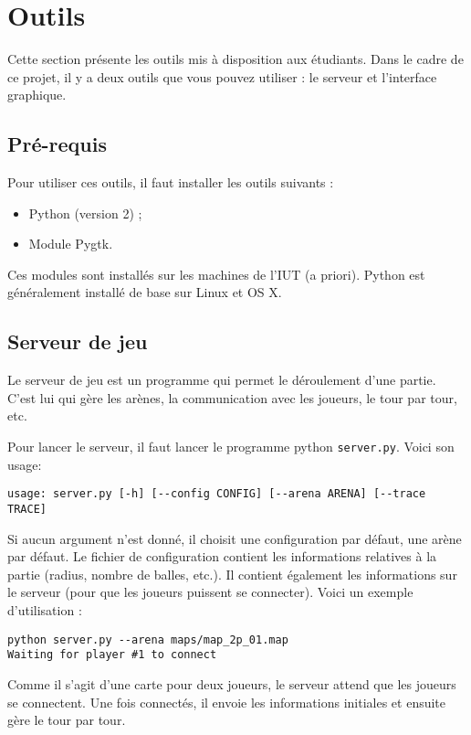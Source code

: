 \section{Outils} %
\label{outils}

Cette section présente les outils mis à disposition aux étudiants.
Dans le cadre de ce projet, il y a deux outils que vous pouvez utiliser : le serveur et l'interface graphique.

\subsection{Pré-requis} %
Pour utiliser ces outils, il faut installer les outils suivants :
\begin{itemize}
    \item Python (version 2) ;
    \item Module Pygtk.
\end{itemize}

Ces modules sont installés sur les machines de l'IUT (a priori).
Python est généralement installé de base sur Linux et OS X.

\subsection{Serveur de jeu} %
Le serveur de jeu est un programme qui permet le déroulement d'une partie.
C'est lui qui gère les arènes, la communication avec les joueurs, le tour par tour, etc.

Pour lancer le serveur, il faut lancer le programme python \lstinline!server.py!.
Voici son usage: 
\begin{lstlisting}
usage: server.py [-h] [--config CONFIG] [--arena ARENA] [--trace TRACE]
\end{lstlisting}

Si aucun argument n'est donné, il choisit une configuration par défaut, une arène par défaut.
Le fichier de configuration contient les informations relatives à la partie (radius, nombre de balles, etc.).
Il contient également les informations sur le serveur (pour que les joueurs puissent se connecter).
Voici un exemple d'utilisation :
\begin{lstlisting}
python server.py --arena maps/map_2p_01.map 
Waiting for player #1 to connect 
\end{lstlisting}

Comme il s'agit d'une carte pour deux joueurs, le serveur attend que les joueurs se connectent.
Une fois connectés, il envoie les informations initiales et ensuite gère le tour par tour.

